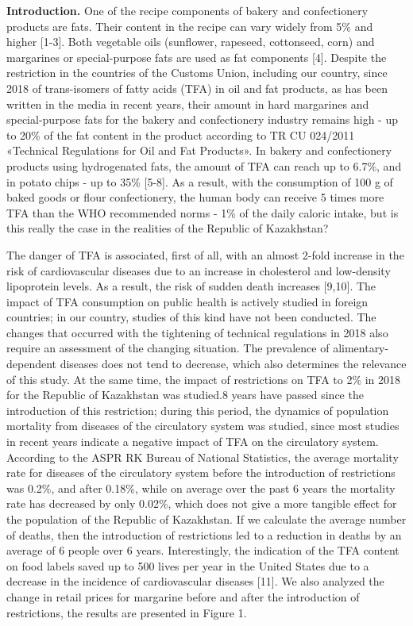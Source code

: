 \begin{multicols}{2}
{\bfseries Introduction.} One of the recipe components of bakery and
confectionery products are fats. Their content in the recipe can vary
widely from 5\% and higher {[}1-3{]}. Both vegetable oils (sunflower,
rapeseed, cottonseed, corn) and margarines or special-purpose fats are
used as fat components {[}4{]}. Despite the restriction in the countries
of the Customs Union, including our country, since 2018 of trans-isomers
of fatty acids (TFA) in oil and fat products, as has been written in the
media in recent years, their amount in hard margarines and
special-purpose fats for the bakery and confectionery industry remains
high - up to 20\% of the fat content in the product according to TR CU
024/2011 «Technical Regulations for Oil and Fat Products». In bakery and
confectionery products using hydrogenated fats, the amount of TFA can
reach up to 6.7\%, and in potato chips - up to 35\% {[}5-8{]}. As a
result, with the consumption of 100 g of baked goods or flour
confectionery, the human body can receive 5 times more TFA than the WHO
recommended norms - 1\% of the daily caloric intake, but is this really
the case in the realities of the Republic of Kazakhstan?

The danger of TFA is associated, first of all, with an almost 2-fold
increase in the risk of cardiovascular diseases due to an increase in
cholesterol and low-density lipoprotein levels. As a result, the risk of
sudden death increases {[}9,10{]}. The impact of TFA consumption on
public health is actively studied in foreign countries; in our country,
studies of this kind have not been conducted. The changes that occurred
with the tightening of technical regulations in 2018 also require an
assessment of the changing situation. The prevalence of
alimentary-dependent diseases does not tend to decrease, which also
determines the relevance of this study. At the same time, the impact of
restrictions on TFA to 2\% in 2018 for the Republic of Kazakhstan was
studied.8 years have passed since the introduction of this restriction;
during this period, the dynamics of population mortality from diseases
of the circulatory system was studied, since most studies in recent
years indicate a negative impact of TFA on the circulatory system.
According to the ASPR RK Bureau of National Statistics, the average
mortality rate for diseases of the circulatory system before the
introduction of restrictions was 0.2\%, and after 0.18\%, while on
average over the past 6 years the mortality rate has decreased by only
0.02\%, which does not give a more tangible effect for the population of
the Republic of Kazakhstan. If we calculate the average number of
deaths, then the introduction of restrictions led to a reduction in
deaths by an average of 6 people over 6 years. Interestingly, the
indication of the TFA content on food labels saved up to 500 lives per
year in the United States due to a decrease in the incidence of
cardiovascular diseases {[}11{]}. We also analyzed the change in retail
prices for margarine before and after the introduction of restrictions,
the results are presented in Figure 1.
\end{multicols}


